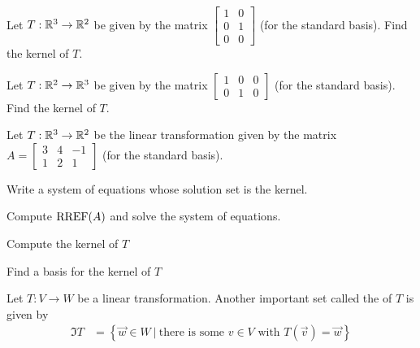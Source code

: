 \begin{applicationActivities}{2}{18}
\begin{definition}
\end{definition}

\begin{activity}{5}
Let $T: \mathbb{R}^3 \rightarrow \mathbb{R}^2$ be given by the matrix $\begin{bmatrix} 1 & 0 \\ 0 & 1 \\ 0 & 0 \end{bmatrix}$ (for the standard basis).  Find the kernel of $T$.
\end{activity}

\begin{activity}{5}
Let $T: \mathbb{R}^2 \rightarrow \mathbb{R}^3$ be given by the matrix $\begin{bmatrix} 1 & 0 &0  \\ 0 & 1 & 0 \end{bmatrix}$ (for the standard basis).  Find the kernel of $T$.
\end{activity}



\begin{activity}{10}
Let $T: \mathbb{R}^3 \rightarrow \mathbb{R}^2$ be the linear transformation given by the matrix $A=\begin{bmatrix} 3 & 4 & -1 \\ 1 & 2 & 1 \end{bmatrix}$ (for the standard basis).
\begin{subactivity}
Write a system of equations whose solution set is the kernel.
\end{subactivity}
\begin{subactivity}
Compute $\operatorname{RREF}(A)$ and solve the system of equations.
\end{subactivity}
\begin{subactivity}
Compute the kernel of $T$
\end{subactivity}
\begin{subactivity}
Find a basis for the kernel of $T$
\end{subactivity}
\end{activity}


\begin{definition}
Let $T: V \rightarrow W$ be a linear transformation.  Another important set called the  of $T$ is given by
\begin{align*}
\Im T &= \left\{ \vec{w} \in W\ \big|\ \text{there is some }v\in V \text{ with } T(\vec{v})=\vec{w}\right\}
\end{align*}
\end{definition}


\end{applicationActivities}
